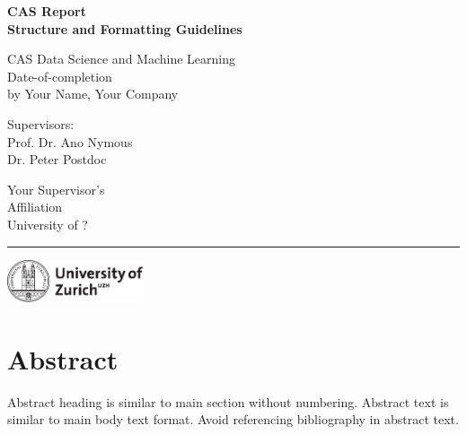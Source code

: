 \documentclass[11pt, a4paper,oneside,chapterprefix=false]{scrbook}
\begin{document}
\frontmatter
\begin{titlepage}
	\setlength{\parindent}{0cm}
	\addtolength{\textheight}{1.0cm}
	\vspace{0.5cm}
	\sffamily\Huge
	{\textbf {CAS Report \\ Structure and Formatting Guidelines}}

	\vfill \vfill \vfill

	\vfill
	\textsf\Large
	CAS Data Science and Machine Learning \\[0.5cm]\large
	Date-of-completion \\[0.5cm]
	\large
	by Your Name, Your Company

	\vfill \vfill \vfill
	\begin{minipage}[b]{0.5\textwidth}
	Supervisors: \\
	Prof. Dr. Ano Nymous \\
	Dr. Peter Postdoc \\
	\end{minipage}
	\begin{minipage}[b]{0.5\textwidth} \raggedleft
	Your Supervisor's \\
	Affiliation \\
	University of ?
	\end{minipage}

	\vfill
	\hrule
	\vspace{0.5cm}
	\includegraphics*[width=0.3\textwidth]{figures/uzh_logo} \hfill
\end{titlepage}


\chapter{Abstract} \label{chp:abstract}

Abstract heading is similar to main section without numbering. Abstract text is similar to main body text format. Avoid referencing bibliography in abstract text.
\end{document}
